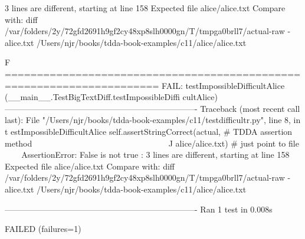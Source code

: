3 lines are different, starting at line 158
Expected file alice/alice.txt
Compare with:
    diff /var/folders/2y/72gfd2691h9gf2cy48xp8slh0000gn/T/tmpga0brll7/actual-raw
-alice.txt /Users/njr/books/tdda-book-examples/c11/alice/alice.txt

F
======================================================================
FAIL: testImpossibleDifficultAlice (__main__.TestBigTextDiff.testImpossibleDiffi
cultAlice)
----------------------------------------------------------------------
Traceback (most recent call last):
  File "/Users/njr/books/tdda-book-examples/c11/testdifficultr.py", line 8, in t
estImpossibleDifficultAlice
    self.assertStringCorrect(actual,                # TDDA assertion method
    ~~~~~~~~~~~~~~~~~~~~~~~~^^^^^^^^^^^^^^^^^^^^^^^^^^^^^^^^^^^^^^^^^^^^^^^
                             \textquotesingle{}alice/alice.txt\textquotesingle{})     # just point to file
                             ^^^^^^^^^^^^^^^^^^
AssertionError: False is not true : 3 lines are different, starting at line 158
Expected file alice/alice.txt
Compare with:
    diff /var/folders/2y/72gfd2691h9gf2cy48xp8slh0000gn/T/tmpga0brll7/actual-raw
-alice.txt /Users/njr/books/tdda-book-examples/c11/alice/alice.txt


----------------------------------------------------------------------
Ran 1 test in 0.008s

FAILED (failures=1)

